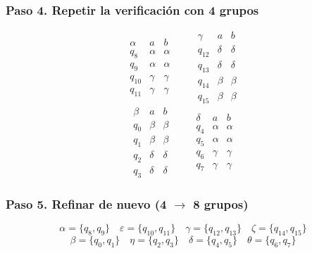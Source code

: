 \documentclass[12pt,letterpaper]{article}
\begin{document}
\begin{enumerate}[label=\arabic*.]
\begin{enumerate}
    \subsubsection*{Paso 4. Repetir la verificación con 4 grupos}
    \[
    \begin{array}{c|cc}
      \alpha & a & b \\ \hline
      q_8 & \alpha & \alpha \\
      q_9 & \alpha & \alpha \\
      q_{10} & \gamma & \gamma \\
      q_{11} & \gamma & \gamma
    \end{array}
    \qquad
    \begin{array}{c|cc}
      \gamma & a & b \\ \hline
      q_{12} & \delta & \delta \\
      q_{13} & \delta & \delta \\
      q_{14} & \beta & \beta \\
      q_{15} & \beta & \beta
    \end{array}
    \]
    \[
    \begin{array}{c|cc}
      \beta & a & b \\ \hline
      q_0 & \beta & \beta \\
      q_1 & \beta & \beta \\
      q_2 & \delta & \delta \\
      q_3 & \delta & \delta
    \end{array}
    \qquad
    \begin{array}{c|cc}
      \delta & a & b \\ \hline
      q_4 & \alpha & \alpha \\
      q_5 & \alpha & \alpha \\
      q_6 & \gamma & \gamma \\
      q_7 & \gamma & \gamma
    \end{array}
    \]

    \subsubsection*{Paso 5. Refinar de nuevo (4 $\to$ 8 grupos)}
    \[
    \alpha = \{q_8,q_9\} \quad \varepsilon = \{q_{10},q_{11}\} \quad \gamma = \{q_{12},q_{13}\} \quad \zeta = \{q_{14},q_{15}\}
    \]
    \[
    \beta = \{q_0,q_1\} \quad \eta = \{q_2,q_3\} \quad \delta = \{q_4,q_5\} \quad \theta = \{q_6,q_7\}
    \]


\end{enumerate}
\end{enumerate}
\end{document}
